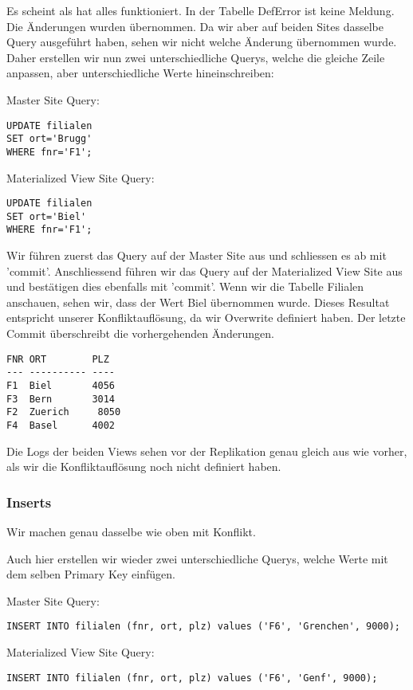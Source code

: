 \documentclass[11pt,a4paper,parskip=half]{scrartcl}
\begin{document}
Es scheint als hat alles funktioniert. In der Tabelle DefError ist keine Meldung. Die Änderungen wurden übernommen. Da wir aber auf beiden Sites dasselbe Query ausgeführt haben, sehen wir nicht welche Änderung übernommen wurde. Daher erstellen wir nun zwei unterschiedliche Querys, welche die gleiche Zeile anpassen, aber unterschiedliche Werte hineinschreiben:

Master Site Query:
\begin{lstlisting}
UPDATE filialen
SET ort='Brugg'
WHERE fnr='F1'; 
\end{lstlisting}

Materialized View Site Query:
\begin{lstlisting}
UPDATE filialen
SET ort='Biel'
WHERE fnr='F1'; 
\end{lstlisting}

Wir führen zuerst das Query auf der Master Site aus und schliessen es ab mit 'commit'. Anschliessend führen wir das Query auf der Materialized View Site aus und bestätigen dies ebenfalls mit 'commit'. Wenn wir die Tabelle Filialen anschauen, sehen wir, dass der Wert Biel übernommen wurde. Dieses Resultat entspricht unserer Konfliktauflösung, da wir Overwrite definiert haben. Der letzte Commit überschreibt die vorhergehenden Änderungen.
\begin{lstlisting}
FNR ORT        PLZ
--- ---------- ----
F1  Biel       4056 
F3  Bern       3014 
F2  Zuerich     8050 
F4  Basel      4002 
\end{lstlisting}

Die Logs der beiden Views sehen vor der Replikation genau gleich aus wie vorher, als wir die Konfliktauflösung noch nicht definiert haben.

\subsubsection{Inserts}
Wir machen genau dasselbe wie oben mit Konflikt.

Auch hier erstellen wir wieder zwei unterschiedliche Querys, welche Werte mit dem selben Primary Key einfügen.

Master Site Query:
\begin{lstlisting}
INSERT INTO filialen (fnr, ort, plz) values ('F6', 'Grenchen', 9000);
\end{lstlisting}

Materialized View Site Query:
\begin{lstlisting}
INSERT INTO filialen (fnr, ort, plz) values ('F6', 'Genf', 9000);
\end{lstlisting}
\end{document}
